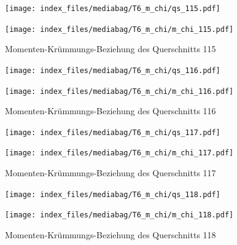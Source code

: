 \documentclass[
  11pt,
  letterpaper,
]{scrreprt}
\begin{document}
\begin{figure}[H]

\begin{minipage}{0.50\linewidth}
\texttt{[image: index\_files/mediabag/T6\_m\_chi/qs\_115.pdf]}\end{minipage}%
%
\begin{minipage}{0.50\linewidth}
\texttt{[image: index\_files/mediabag/T6\_m\_chi/m\_chi\_115.pdf]}\end{minipage}%

\caption{\label{fig-mchi_anhang}Momenten-Krümmungs-Beziehung des
Querschnitts 115}

\end{figure}%

\begin{figure}[H]

\begin{minipage}{0.50\linewidth}
\texttt{[image: index\_files/mediabag/T6\_m\_chi/qs\_116.pdf]}\end{minipage}%
%
\begin{minipage}{0.50\linewidth}
\texttt{[image: index\_files/mediabag/T6\_m\_chi/m\_chi\_116.pdf]}\end{minipage}%

\caption{\label{fig-mchi_anhang}Momenten-Krümmungs-Beziehung des
Querschnitts 116}

\end{figure}%

\begin{figure}[H]

\begin{minipage}{0.50\linewidth}
\texttt{[image: index\_files/mediabag/T6\_m\_chi/qs\_117.pdf]}\end{minipage}%
%
\begin{minipage}{0.50\linewidth}
\texttt{[image: index\_files/mediabag/T6\_m\_chi/m\_chi\_117.pdf]}\end{minipage}%

\caption{\label{fig-mchi_anhang}Momenten-Krümmungs-Beziehung des
Querschnitts 117}

\end{figure}%

\begin{figure}[H]

\begin{minipage}{0.50\linewidth}
\texttt{[image: index\_files/mediabag/T6\_m\_chi/qs\_118.pdf]}\end{minipage}%
%
\begin{minipage}{0.50\linewidth}
\texttt{[image: index\_files/mediabag/T6\_m\_chi/m\_chi\_118.pdf]}\end{minipage}%

\caption{\label{fig-mchi_anhang}Momenten-Krümmungs-Beziehung des
Querschnitts 118}

\end{figure}%
\end{document}
